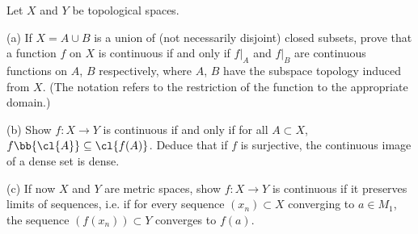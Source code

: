 \begin{problem}
Let $X$ and $Y$ be topological spaces.
\ben
\item [(a)] If $X = A \cup B$ is a union of (not necessarily disjoint) closed subsets, prove that a function $f$ on $X$ is continuous if and only if $f|_A$ and $f|_B$ are continuous functions on $A$, $B$ respectively, where $A$, $B$ have the subspace topology induced from $X$. (The notation refers to the restriction of the function to the appropriate domain.)
\item [(b)] Show $f : X \to Y$ is continuous if and only if for all $A\subset X$, $f\bb{\cl{A}} \subseteq \cl{f(A)}$. Deduce that if $f$ is surjective, the continuous image of a dense set is dense.
\item [(c)] If now $X$ and $Y$ are metric spaces, show $f : X \to Y$ is continuous if it preserves limits of sequences, i.e. if for every sequence $(x_n) \subset X$ converging to $a \in M_1$, the sequence $(f(x_n)) \subset Y$ converges to $f(a)$.
\een
\end{problem}

